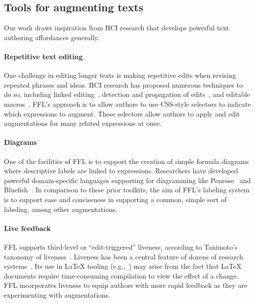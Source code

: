 \subsection{Tools for augmenting texts}
Our work draws inspiration from HCI research that develops powerful text authoring affordances generally.

\paragraph{Repetitive text editing}
One challenge in editing longer texts is making repetitive edits when revising repeated phrases and ideas. HCI research has proposed numerous techniques to do so, including linked editing~\cite{ref:toomim2004managing}, detection and propagation of edits~\cite{ref:miltner2019fly,ref:ni2021recode}, and editable macros~\cite{ref:han2020textlets}. FFL's approach is to allow authors to use CSS-style selectors to indicate which expressions to augment. These selectors allow authors to apply and edit augmentations for many related expressions at once.

\paragraph{Diagrams}
One of the facilities of FFL is to support the creation of simple formula diagrams where descriptive labels are linked to expressions. Researchers have developed powerful domain-specific languages supporting for diagramming like Penrose~\cite{ref:ye2020penrose} and Bluefish~\cite{ref:pollock2022bluefish}. In comparison to these prior toolkits, the aim of FFL's labeling system is to support ease and conciseness in supporting a common, simple sort of labeling, among other augmentations.

\paragraph{Live feedback}
FFL supports third-level or ``edit-triggered'' liveness, according to Tanimoto's taxonomy of liveness~\cite{ref:tanimoto1990viva}. Liveness has been a central feature of dozens of research systems~\cite{ref:rein2018exploratory}. Its use in LaTeX tooling (e.g.,~\cite{ref:gobert2022ilatex,ref:dragicevic2011gliimpse}) may arise from the fact that LaTeX documents require time-consuming compilation to view the effect of a change. FFL incorporates liveness to equip authors with more rapid feedback as they are experimenting with augmentations.

